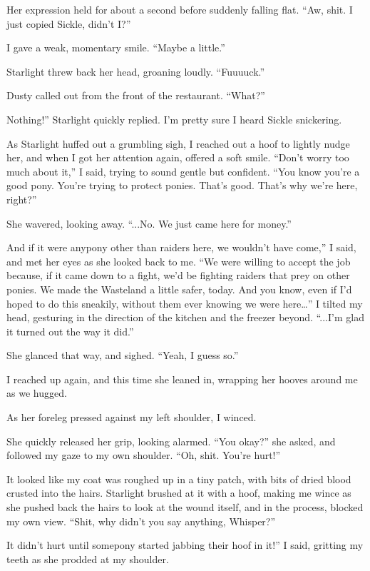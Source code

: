 Her expression held for about a second before suddenly falling flat. “Aw, shit. I just copied Sickle, didn’t I?”

I gave a weak, momentary smile. “Maybe a little.”

Starlight threw back her head, groaning loudly. “Fuuuuck.”

Dusty called out from the front of the restaurant. “What?”

\leavevmode{}Nothing!” Starlight quickly replied. I’m pretty sure I heard Sickle snickering.

As Starlight huffed out a grumbling sigh, I reached out a hoof to lightly nudge her, and when I got her attention again, offered a soft smile. “Don’t worry too much about it,” I said, trying to sound gentle but confident. “You know you’re a good pony. You’re trying to protect ponies. That’s good. That’s why we’re here, right?”

She wavered, looking away. “...No. We just came here for money.”

\leavevmode{}And if it were anypony other than raiders here, we wouldn’t have come,” I said, and met her eyes as she looked back to me. “We were willing to accept the job because, if it came down to a fight, we’d be fighting raiders that prey on other ponies. We made the Wasteland a little safer, today. And you know, even if I’d hoped to do this sneakily, without them ever knowing we were here…” I tilted my head, gesturing in the direction of the kitchen and the freezer beyond. “...I’m glad it turned out the way it did.”

She glanced that way, and sighed. “Yeah, I guess so.”

I reached up again, and this time she leaned in, wrapping her hooves around me as we hugged.

As her foreleg pressed against my left shoulder, I winced.

She quickly released her grip, looking alarmed. “You okay?” she asked, and followed my gaze to my own shoulder. “Oh, shit. You’re hurt!”

It looked like my coat was roughed up in a tiny patch, with bits of dried blood crusted into the hairs. Starlight brushed at it with a hoof, making me wince as she pushed back the hairs to look at the wound itself, and in the process, blocked my own view. “Shit, why didn’t you say anything, Whisper?”

\leavevmode{}It didn’t hurt until somepony started jabbing their hoof in it!” I said, gritting my teeth as she prodded at my shoulder.

